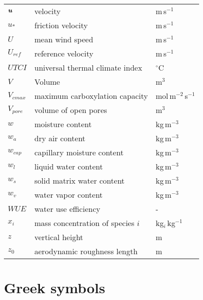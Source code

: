 \begin{longtable}{p{}p{}p{}}
	$\textbf{\textit{u}}$ & velocity & m\,s$^{-1}$ \\ 
	$u_*$ & friction velocity & m\,s$^{-1}$ \\ 
	$U$ & mean wind speed & m\,s$^{-1}$ \\ 
	$U_{\textit{ref}}$ & reference velocity & m\,s$^{-1}$ \\ 	
	$\textit{UTCI}$ & universal thermal climate index & $^{\circ}$C \\ 	

	$V$ & Volume & m$^{3}$ \\ 
	$V_{\textit{cmax}}$ & maximum carboxylation capacity & mol\,m$^{-2}$\,s$^{-1}$ \\ 
	$V_{\textit{pore}}$ & volume of open pores & m$^{3}$ \\ 
	$w$ & moisture content & kg\,m$^{-3}$ \\ 
	$w_a$ & dry air content & kg\,m$^{-3}$ \\ 	

	$w_{\textit{cap}}$ & capillary moisture content & kg\,m$^{-3}$ \\ 
	$w_l$ & liquid water content & kg\,m$^{-3}$ \\ 		
	$w_s$ & solid matrix water content & kg\,m$^{-3}$ \\ 
	$w_v$ & water vapor content & kg\,m$^{-3}$ \\ 		
	$\textit{WUE}$ & water use efficiency & - \\ 			
	$x_i$ & mass concentration of species $i$ & kg$_i$\,kg$^{-1}$ \\ 	
	$z$ & vertical height & m \\ 	
	$z_0$ & aerodynamic roughness length & m \\ 		
\end{longtable}
\vfill
\bigskip
\section*{Greek symbols}


